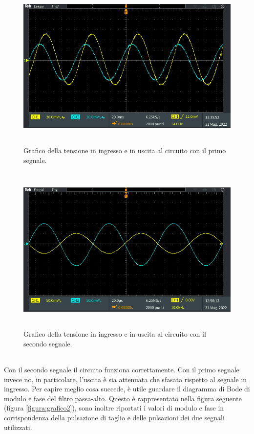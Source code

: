 \documentclass{report}
\begin{document}
\begin{figure}[h]
\centering
\includegraphics[height=8.4cm]{immagini/oscillo10}
\caption{Grafico della tensione in ingresso e in uscita al circuito con il primo segnale.}
\label{figura:oscillo10}
\end{figure}
\begin{figure}[h!]
\centering
\includegraphics[height=8.4cm]{immagini/oscillo11}
\caption{Grafico della tensione in ingresso e in uscita al circuito con il secondo segnale.}
\label{figura:oscillo11}
\end{figure}
\\Con il secondo segnale il circuito funziona correttamente. Con il primo segnale invece no, in particolare, l'uscita è sia attenuata che sfasata rispetto al segnale in ingresso. Per capire meglio cosa succede, è utile guardare il diagramma di Bode di modulo e fase del filtro passa-alto. Questo è rappresentato nella figura seguente (figura \ref{figura:grafico2}), sono inoltre riportati i valori di modulo e fase in corrispondenza della pulsazione di taglio e delle pulsazioni dei due segnali utilizzati.
\end{document}
